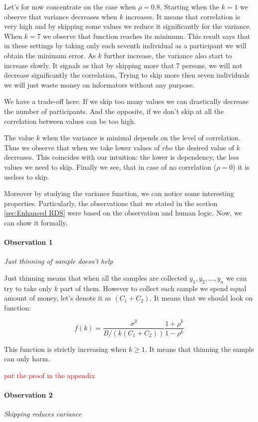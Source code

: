 \documentclass[12pt]{report}
\newcommand\myworries[1]{\textcolor{red}{#1}}
\begin{document}
Let's for now concentrate on the case when $\rho = 0.8$. Starting when the $k = 1$ we observe that variance decreases when $k$ increases. It means that correlation is very high and by skipping some values we reduce it significantly for the variance. When $k = 7$ we observe that function reaches its minimum. This result says that in these settings by taking only each seventh individual as a participant we will obtain the minimum error.  As $k$ further increase, the variance also start to increase slowly. It signals as that by skipping more that 7 persons, we will not decrease significantly the correlation, Trying to skip more then seven individuals we will just waste money on informators without any purpose.

We have a trade-off here. If we skip too many values we can drastically decrease the number of participants. And the opposite, if we don't skip at all the correlation between values can be too high. 

The value $k$ when the variance is minimal depends on the level of correlation. Thus we observe that when we take lower values of $rho$ the desired value of $k$ decreases. This coincides with our intuition: the lower is dependency, the less values we need to skip. Finally we see, that in case of no correlation ($\rho = 0$) it is useless to skip.
 
Moreover by studying the variance function, we can notice some interesting properties. Particularly, the observations that we stated in the scetion \ref{sec:Enhanced RDS} were based on the observation and human logic. Now, we can show it formally.

\paragraph{Observation 1} \textit{Just thinning of sample doesn't help}

Just thinning means that when all the samples are collected $y_1, y_2, ...,y_n$ we can try to take only $k$ part of them. However to collect each sample we spend equal amount of money, let's denote it as $(C_1+C_2)$. It means that we should look on function:

$$ f(k) = \frac{\sigma^2}{B/(k(C_1 + C_2))} \frac{1+\rho^{k}}{1-\rho^{k}}$$

This function is strictly increasing when $k \geq 1$. It means that thinning the sample can only harm. 

\myworries{put the proof in the appendix}

\paragraph{Observation 2} \textit{Skipping reduces variance}
\end{document}
